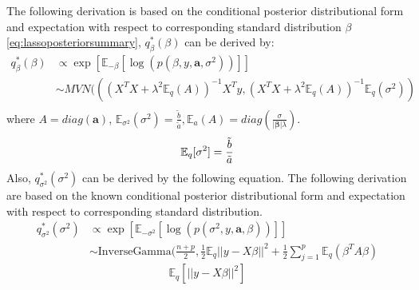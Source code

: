 The following derivation is based on the conditional posterior distributional form and expectation with respect to corresponding standard distribution
$\beta$  \autoref{eq:lassoposteriorsummary}, $q_{\beta}^{*}(\beta)$ can be derived by:
\begin{equation}
	\begin{aligned}
		q_{\beta}^{*}(\beta) & \propto \exp[\mathbb{E}_{-\beta}[\log(p(\beta, y,\mathbf{a},\sigma^2))]]\\
		& \sim MVN(((X^TX + \lambda^2\mathbb{E}_q(A))^{-1}X^Ty, (X^TX+\lambda^2\mathbb{E}_q(A))^{-1}\mathbb{E}_{q}(\sigma^2))\\
	\end{aligned}
\end{equation}
where $A = diag(\mathbf{a})$, $\mathbb{E}_{\sigma^2}(\sigma^2) = \frac{\tilde{b}}{\tilde{a}}, \mathbb{E}_a(A) = diag(\frac{\sigma}{|\mathbf{\beta}|\lambda})$. 
$$
\mathbb{E}_{q}[\sigma^2] = \frac{\tilde{b}}{\tilde{a}}\\
$$
Also, $q_{\sigma^2}^{*}(\sigma^2)$ can be derived by the following equation.
The following derivation are based on the known conditional posterior distributional form and expectation with respect to corresponding standard distribution.
\begin{equation}
	\begin{aligned}
		q_{\sigma^2}^{*}(\sigma^2) & \propto \exp[\mathbb{E}_{-\sigma^2}[\log(p(\sigma^2, y,\mathbf{a},\beta))]]\\
		&\sim \text{InverseGamma}(\frac{n+p}{2}, \frac{1}{2} \mathbb{E}_q||y-X\beta||^2 + \frac{1}{2}\sum_{j=1}^p \mathbb{E}_q(\beta^TA\beta)
	\end{aligned}
\end{equation}
$$
\mathbb{E}_{q}[||y-X\beta||^2]
$$

